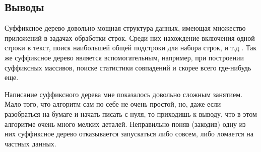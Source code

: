 \documentclass[12pt]{article}
\begin{document}
	\subsection*{Выводы}
	Суффиксное дерево довольно мощная структура данных, имеющая множество приложений в задачах обработки строк. Среди них нахождение включения одной строки в текст, поиск наибольшей общей подстроки для набора строк, и т.д . Так же суффиксное дерево является вспомогательным, например, при построении суффиксных массивов, поиске статистики совпадений и скорее всего где-нибудь еще.
	
	Написание суффиксного дерева мне показалось довольно сложным занятием.
	Мало того, что алгоритм сам по себе не очень простой, но, даже если разобраться на бумаге и начать писать с нуля, то приходишь к выводу, что в этом алгоритме очень много мелких деталей. Неправильно поняв (закодив) одну из них суффиксное дерево отказывается запускаться либо совсем, либо ломается на частных данных.
\end{document}
